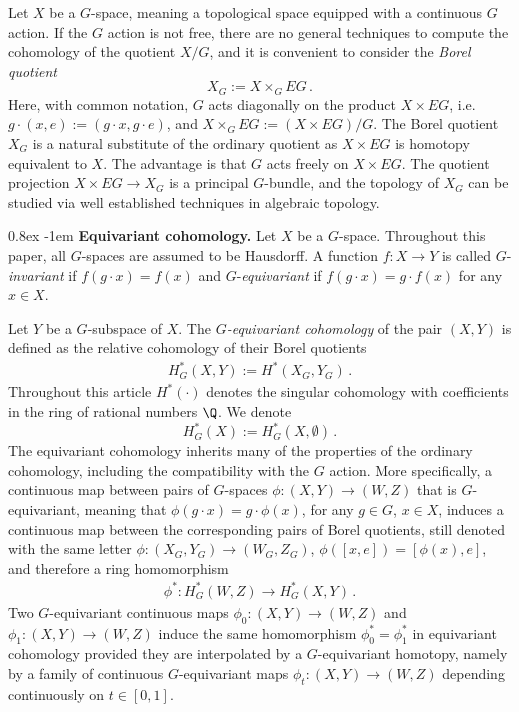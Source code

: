 \documentclass[11pt,a4paper,reqno]{article}
\makeatletter
\renewcommand{\paragraph}{%
  \@startsection{paragraph}{4}{\z@}%
  {0.8ex}  %
  {-1em}   %
  {\normalfont\bfseries}%
}
\numberwithin{equation}{section}
\theoremstyle{definition}
\makeatother
\begin{document}
Let $X$ be a $G$-space, meaning a topological space equipped with a continuous $G$ action. 
If  the $G$ action is not free, there are no general techniques to compute the cohomology of the quotient $X/G$, 
and it is convenient to consider the \emph{Borel quotient}
\begin{equation}\label{Borelq}
X_G:= X \times_G EG \,. 
\end{equation}
Here, with common notation, $G$ acts diagonally on the product $X\times EG$, i.e.~$g\cdot(x,e) := (g\cdot x,g\cdot e)$, and $X \times_G EG := (X \times EG)/G $. The  Borel quotient
$ X_G $
is a natural substitute of the ordinary quotient  as $X\times EG$ is homotopy equivalent to $X$. The advantage is  that $G$ acts freely on $X\times EG$. The quotient projection $X\times EG\to X_G$ is a principal $G$-bundle, and the topology of $X_G$ can be studied via well established techniques in algebraic topology.

\paragraph{\bf Equivariant cohomology.}
Let $X$ be a $G$-space.
Throughout this paper, all $G$-spaces are  assumed to be Hausdorff. 
A function $f:X\to Y$ is called $G$-{\it invariant} if  $ f(g\cdot x)=f(x)$ and $G$-{\it equivariant} if $f(g\cdot x)=g\cdot f(x)$ for any $ x\in X$.




\smallskip

Let $Y$ be a $G$-subspace of $X$. The \emph{$G$-equivariant cohomology} of the pair $(X, Y) $ is defined as the relative cohomology of their Borel quotients
\begin{align*}
H^*_G(X,Y):=H^*(X_G,Y_G) \, .
\end{align*}
Throughout this article $H^*(\cdot)$ denotes the singular cohomology with coefficients in the ring of rational numbers $\Q$.
We denote 
\[
H^*_G(X):=H^*_G(X,\emptyset) \, .
\]
The equivariant cohomology inherits many of the properties of the ordinary  cohomology,
including the compatibility with the $G$ action. More specifically, a continuous map between pairs of $G$-spaces $\phi:(X,Y)\to (W,Z)$ that is $G$-equivariant, meaning that 
$ \phi(g\cdot x)=g\cdot\phi(x) $, 
for any $ g\in G $,
$ x\in X $, 
induces a continuous map between the corresponding pairs of Borel quotients, still denoted with the same letter $\phi:(X_G,Y_G)\to (W_G,Z_G)$, $\phi([x,e])=[\phi(x),e]$, and therefore a ring homomorphism
\begin{align}\label{e:homomorphism_HG}
\phi^*:H^*_G(W,Z)\to H^*_G(X,Y) \, .
\end{align}
Two  $G$-equivariant continuous maps $\phi_0:(X,Y)\to (W,Z)$ and $\phi_1:(X,Y)\to (W,Z)$ induce the same homomorphism $\phi_0^*=\phi_1^*$ in equivariant cohomology provided they are interpolated by a $G$-equivariant homotopy, namely by a family of continuous $G$-equivariant maps $\phi_t:(X,Y)\to (W,Z)$ depending continuously on $t\in[0,1]$.
\end{document}
